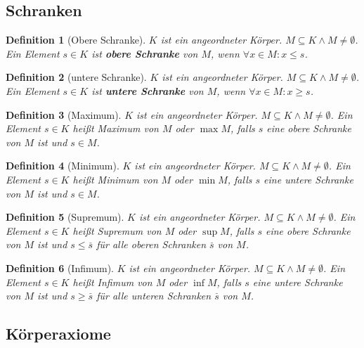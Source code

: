 \documentclass{article}
\newtheorem*{definition}{Definition}
\begin{document}
\pagebreak

\subsection*{Schranken}

\begin{definition}[Obere Schranke]
  $K$ ist ein angeordneter Körper. $M \subseteq K \land M \ne \emptyset$.
  Ein Element $s \in K$ ist \textbf{obere Schranke} von $M$, wenn $\forall x \in M \colon x \leq s$. 
\end{definition}

\begin{definition}[untere Schranke]
  $K$ ist ein angeordneter Körper. $M \subseteq K \land M \ne \emptyset$.
  Ein Element $s \in K$ ist \textbf{untere Schranke} von $M$, wenn $\forall x \in M \colon x \geq s$. 
\end{definition}

\begin{definition}[Maximum]
  $K$ ist ein angeordneter Körper. $M \subseteq K \land M \ne \emptyset$.
  Ein Element $s \in K$ heißt Maximum von $M$ oder $\max M$, falls $s$ eine obere Schranke von $M$
  ist und $s \in M$.
\end{definition}

\begin{definition}[Minimum]
  $K$ ist ein angeordneter Körper. $M \subseteq K \land M \ne \emptyset$.
  Ein Element $s \in K$ heißt Minimum von $M$ oder $\min M$, falls $s$ eine untere Schranke von $M$
  ist und $s \in M$.
\end{definition}

\begin{definition}[Supremum]
  $K$ ist ein angeordneter Körper. $M \subseteq K \land M \ne \emptyset$.
  Ein Element $s \in K$ heißt Supremum von $M$ oder $\sup M$, falls $s$ eine obere Schranke von $M$
  ist und $s \leq \overset\_s$ für alle oberen Schranken $\overset\_s$ von $M$.
\end{definition}

\begin{definition}[Infimum]
  $K$ ist ein angeordneter Körper. $M \subseteq K \land M \ne \emptyset$.
  Ein Element $s \in K$ heißt Infimum von $M$ oder $\inf M$, falls $s$ eine untere Schranke von $M$
  ist und $s \geq \overset\_s$ für alle unteren Schranken $\overset\_s$ von $M$.
\end{definition}


\pagebreak

\subsection*{Körperaxiome}
\end{document}
